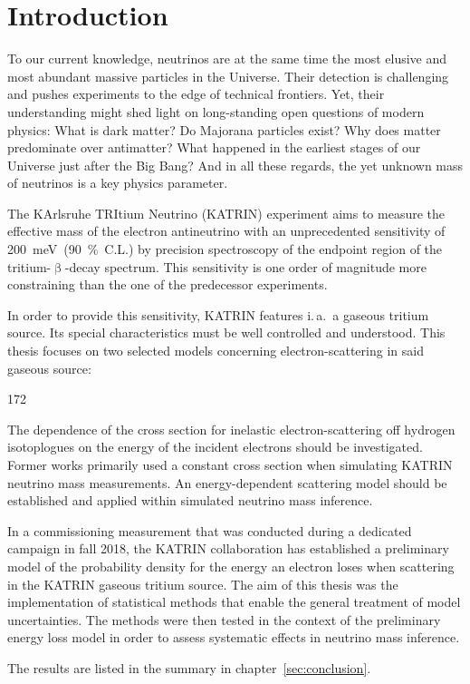 \chapter{Introduction}
To our current knowledge, neutrinos are at the same time the most elusive and most abundant massive particles in the Universe. Their detection is challenging and pushes experiments to the edge of technical frontiers. Yet, their understanding might shed light on long-standing open questions of modern physics: What is dark matter? Do Majorana particles exist? Why does matter predominate over antimatter? What happened in the earliest stages of our Universe just after the Big Bang? And in all these regards, the yet unknown mass of neutrinos is a key physics parameter.

The KArlsruhe TRItium Neutrino (KATRIN) experiment aims to measure the effective mass of the electron antineutrino with an unprecedented sensitivity of \mbox{\SI{200}{meV} (\SI{90}{\percent} C.L.)} by precision spectroscopy of the endpoint region of the tritium-$\upbeta$-decay spectrum. This sensitivity is one order of magnitude more constraining than the one of the predecessor experiments.

In order to provide this sensitivity, KATRIN features i.\,a.~a gaseous tritium source. Its special characteristics must be well controlled and understood. This thesis focuses on two selected models concerning electron-scattering in said gaseous source: 
\begin{dingautolist}{172}
	\item\label{itm:introductionEDepCrossSec} The dependence of the cross section for inelastic electron-scattering off hydrogen isotoplogues on the energy of the incident electrons should be investigated. Former works primarily used a constant cross section when simulating KATRIN neutrino mass measurements. An energy-dependent scattering model should be established and applied within simulated neutrino mass inference.
	\item\label{itm:introductionKatrinEloss} In a commissioning measurement that was conducted during a dedicated campaign in fall 2018, the KATRIN collaboration has established a preliminary model of the probability density for the energy an electron loses when scattering in the KATRIN gaseous tritium source. The aim of this thesis was the implementation of statistical methods that enable the general treatment of model uncertainties. The methods were then tested in the context of the preliminary energy loss model in order to assess systematic effects in neutrino mass inference.
\end{dingautolist}
The results are listed in the summary in chapter~\ref{sec:conclusion}.

